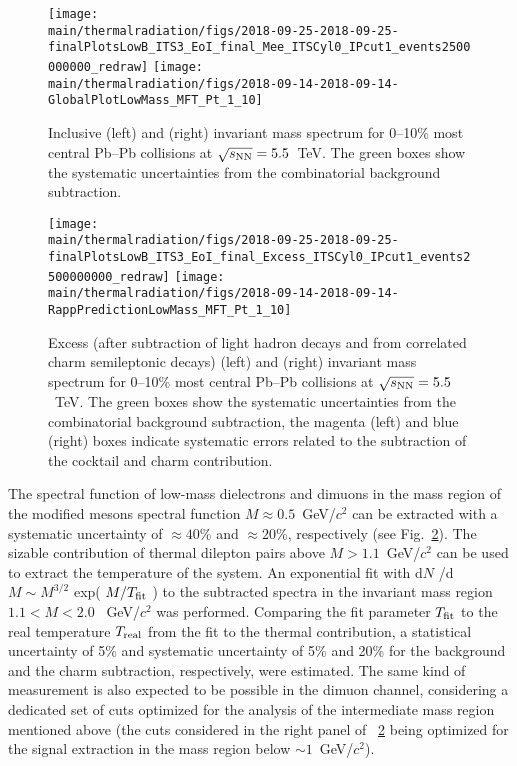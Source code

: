 \documentclass[../report.tex]{subfiles}
\providecommand{\main}{..}
\begin{document}
\begin{figure}[htb]
\centering
\texttt{[image: \\main/thermalradiation/figs/2018-09-25-2018-09-25-finalPlotsLowB\_ITS3\_EoI\_final\_Mee\_ITSCyl0\_IPcut1\_events2500000000\_redraw]}
\texttt{[image: \\main/thermalradiation/figs/2018-09-14-2018-09-14-GlobalPlotLowMass\_MFT\_Pt\_1\_10]}
\caption{Inclusive \Pepem (left) and \PGmpGmm (right) invariant mass spectrum for 0--10\% most central Pb--Pb collisions at $\sqrt{s_{\rm NN}} = 5.5$~TeV. The green boxes show the systematic uncertainties from the combinatorial background subtraction.}
\label{fig:DileptonsSpectra}
\end{figure}

\begin{figure}[htb]
\centering
\texttt{[image: \\main/thermalradiation/figs/2018-09-25-2018-09-25-finalPlotsLowB\_ITS3\_EoI\_final\_Excess\_ITSCyl0\_IPcut1\_events2500000000\_redraw]}
\texttt{[image: \\main/thermalradiation/figs/2018-09-14-2018-09-14-RappPredictionLowMass\_MFT\_Pt\_1\_10]}
\caption{Excess (after subtraction of light hadron decays and from correlated charm semileptonic decays) \Pepem (left) and \PGmpGmm (right) invariant mass spectrum for 0--10\% most central Pb--Pb collisions at $\sqrt{s_{\rm NN}} = 5.5$~TeV. The green boxes show the systematic uncertainties from the combinatorial background subtraction, the magenta (left) and blue (right) boxes indicate systematic errors related to the subtraction of the cocktail and charm contribution.}
\label{fig:DileptonsSpectraSubtracted}
\end{figure}

The spectral function of low-mass dielectrons and dimuons in the mass region of the modified \Prho mesons spectral function $M\approx0.5$~GeV/$c^2$ can be extracted with a systematic uncertainty of $\approx 40$\% and $\approx 20$\%, respectively (see Fig.~\ref{fig:DileptonsSpectraSubtracted}). 
The sizable contribution of thermal dilepton pairs above $M>1.1$~GeV/$c^2$ can be used to extract the temperature of the system. An exponential fit with d$N$ /d$M \sim  M^{3/2}$ exp( $M /T_{\rm fit}$ ) to the subtracted \Pepem spectra in the invariant mass region $1.1 < M < 2.0$ ~GeV/$c^2$ was performed. Comparing the fit parameter $T_{\rm fit}$ to the real temperature $T_{\rm real}$ from the fit to the thermal contribution, a statistical uncertainty of 5\% and systematic uncertainty of 5\% and 20\% for the background and the charm subtraction, respectively, were estimated. The same kind of measurement is also expected to be possible in the dimuon channel, considering a dedicated set of cuts optimized for the analysis of the intermediate mass region mentioned above (the cuts considered in the right panel of \figurename~\ref{fig:DileptonsSpectraSubtracted} being optimized for the signal extraction in the mass region below $\sim 1$~GeV/$c^2$).
\end{document}
